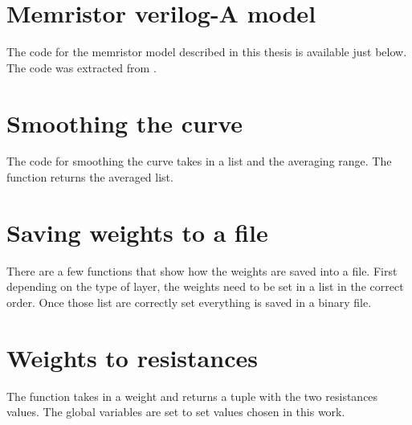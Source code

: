 \label{ap:codes}
\pythonstyle

\section{Memristor verilog-A model}\label{apsec:memModel}

The code for the memristor model described in this thesis is available just below. The code was extracted from \cite{memCadenceModel}.



\section{Smoothing the curve}\label{apsec:smoothFunc}

The code for smoothing the curve takes in a list and the averaging range. The function returns the averaged list.



\section{Saving weights to a file}\label{apsec:saveWei}

There are a few functions that show how the weights are saved into a file.
First depending on the type of layer, the weights need to be set in a list in the correct order.
Once those list are correctly set everything is saved in a binary file.



\section{Weights to resistances}\label{apsec:wei2res}

The function takes in a weight and returns a tuple with the two resistances values. The global variables are set to set values chosen in this work.




